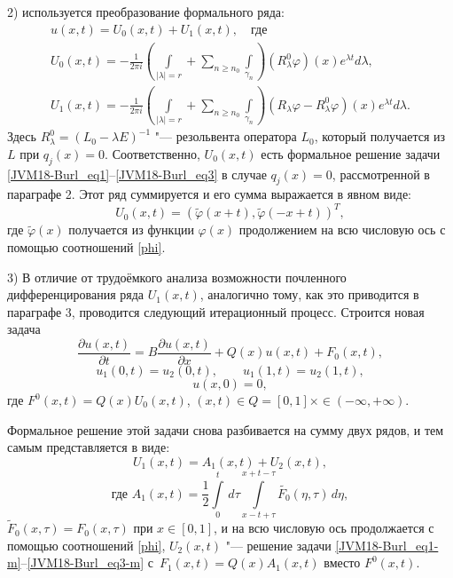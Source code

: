 2) используется преобразование формального  ряда:
\begin{equation}\label{Burl_eq5-1}
\begin{array}{c}
u(x,t)=U_0(x,t)+U_1(x,t), \quad \text{где }\\
 U_0(x,t)=-\frac{1}{2\pi i}\left(
\int\limits_{|\lambda |=r}{{}}+
    \sum\limits_{n\geqslant {{n}_{0}}}{\int\limits_{{{\gamma }_{n}}}{{}}} \right)
    ({{R}_{\lambda }^0}\varphi )(x){{e}^{\lambda t}}d\lambda, \\
 U_1(x,t)=-\frac{1}{2\pi i}\left( \int\limits_{|\lambda |=r}{{}}+
    \sum\limits_{n\geqslant {{n}_{0}}}{\int\limits_{{{\gamma }_{n}}}{{}}} \right)
    ({{R}_{\lambda }}\varphi- {R}_{\lambda }^0 \varphi)(x){{e}^{\lambda
    t}}d\lambda.
    \end{array}
\end{equation}
Здесь $R_{\lambda}^0=(L_0-\lambda E)^{-1}$ "--- резольвента оператора
$L_0$, который получается из $L$ при $q_j(x)=0$. Соответственно,
$U_0(x,t)$ есть формальное решение задачи
\eqref{JVM18-Burl_eq1}--\eqref{JVM18-Burl_eq3} в случае $q_j(x)=0$,
  рассмотренной в параграфе 2. Этот ряд суммируется и его сумма выражается в
  явном виде:
$$ U_0(x,t)=(\widetilde{\varphi}(x+t),\widetilde{\varphi}(-x+t))^T,
$$
 где $\widetilde{\varphi}(x)$ получается из функции ${\varphi}(x)$  продолжением на всю числовую ось   с помощью соотношений
\eqref{phi}.


3) В отличие от трудоёмкого анализа возможности почленного
дифференцирования ряда $U_1(x,t)$, аналогично тому, как это
приводится в параграфе 3, проводится следующий итерационный процесс.
Строится новая задача
\begin{equation}\label{JVM18-Burl_eq1-m}
\frac{\partial u(x,t)}{\partial t}=B\frac{\partial u(x,t)}{\partial
x}+Q(x)u(x,t) + F_0(x,t),
\end{equation}
\begin{equation}\label{JVM18-Burl_eq2-m}
     {{u}_{1}}(0,t)={{u}_{2}}(0,t),   \qquad {{u}_{1}}(1,t)={{u}_{2}}(1,t),
     \end{equation}
\begin{equation}\label{JVM18-Burl_eq3-m}
     u(x,0)=0,
\end{equation}
где $F^0(x,t)= Q(x)U_0(x,t)$, $(x,t)\in Q=[0,1]\times\in
(-\infty,+\infty )$.

Формальное решение этой задачи снова разбивается на сумму двух
рядов, и тем самым  представляется в виде:
$$
U_{1}(x,t) = A_1 (x,t)+ U_2(x,t),$$
$$\text{где }
 A_{1}(x,t)=\frac{1}{2}
\int\limits_0^t\,d\tau\int\limits_{x-t+\tau}^{x+t-\tau}
 \widetilde{F_0}(\eta,\tau)\,d\eta, $$
$\widetilde{F}_0(x,\tau)={F}_0(x,\tau)$ при $x\in [0,1]$, и на всю
числовую ось продолжается с помощью соотношений \eqref{phi},
$U_{2}(x,t)$
"--- решение задачи  \eqref{JVM18-Burl_eq1-m}--\eqref{JVM18-Burl_eq3-m} с~$F_1(x,t)=
Q(x)A_1(x,t)$ вместо $F^0(x,t)$.

